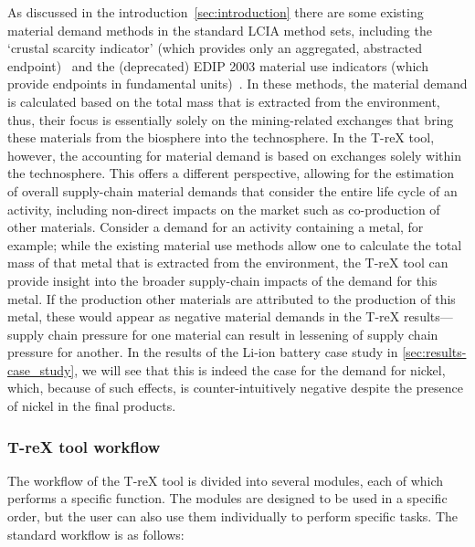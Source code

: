 As discussed in the introduction~\ref{sec:introduction} there are some existing material demand methods in the standard LCIA method sets, including the `crustal scarcity indicator' (which provides only an aggregated, abstracted endpoint)~\citep{arvidsson2020csi} and the (deprecated) EDIP 2003 material use indicators (which provide endpoints in fundamental units)~\citep{hauschild2003edip}. In these methods, the material demand is calculated based on the total mass that is extracted from the environment, thus, their focus is essentially solely on the mining-related exchanges that bring these materials from the biosphere into the technosphere. In the T-reX tool, however, the accounting for material demand is based on exchanges solely within the technosphere. This offers a different perspective, allowing for the estimation of overall supply-chain material demands that consider the entire life cycle of an activity, including non-direct impacts on the market such as co-production of other materials. Consider a demand for an activity containing a metal, for example; while the existing material use methods allow one to calculate the total mass of that metal that is extracted from the environment, the T-reX tool can provide insight into the broader supply-chain impacts of the demand for this metal. If the production other materials are attributed to the production of this metal, these would appear as negative material demands in the T-reX results---supply chain pressure for one material can result in lessening of supply chain pressure for another. In the results of the Li-ion battery case study in \autoref{sec:results-case_study}, we will see that this is indeed the case for the demand for nickel, which, because of such effects, is counter-intuitively negative despite the presence of nickel in the final products.



\subsubsection{T-reX tool workflow}

The workflow of the T-reX tool is divided into several modules, each of which performs a specific function. The modules are designed to be used in a specific order, but the user can also use them individually to perform specific tasks. The standard workflow is as follows:

